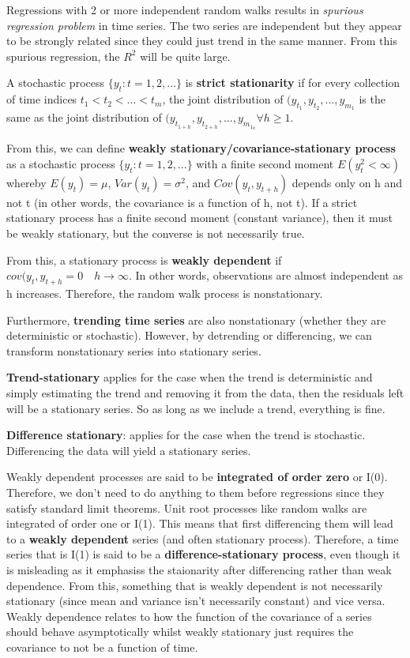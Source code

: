 \documentclass[11pt, oneside]{article}
\theoremstyle{definition}
\begin{document}
Regressions with 2 or more independent random walks results in \textit{spurious regression problem} in time series. The two series are independent but they appear to be strongly related since they could just trend in the same manner. From this spurious regression, the $R^2$ will be quite large.


A stochastic process $\{y_t:t=1,2,...\}$ is \textbf{strict stationarity} if for every collection of time indices $t_1 < t_2 < ... < t_m$, the joint distribution of $(y_{t_{1}},y_{t_{2}},...,y_{m_{1}}$ is the same as the joint distribution of $(y_{t_{1+h}},y_{t_{2+h}},...,y_{m_{1_h}} \forall h \geq 1$.

From this, we can define \textbf{weakly stationary/covariance-stationary process} as a stochastic process $\{y_t:t=1,2,...\}$ with a finite second moment $E(y_t^2 < \infty)$ whereby $E(y_t) = \mu$, $Var(y_t) = \sigma^2$, and $Cov(y_t, y_{t+h})$ depends only on h and not t (in other words, the covariance is a function of h, not t).  If a strict stationary process has a finite second moment (constant variance), then it must be weakly stationary, but the converse is not necessarily true.

From this, a stationary process is \textbf{weakly dependent} if $cov(y_t,y_{t+h} = 0 \quad h \rightarrow \infty$. In other words, observations are almost independent as h increases. Therefore, the random walk process is nonstationary.

Furthermore, \textbf{trending time series} are also nonstationary (whether they are deterministic or stochastic). However, by detrending or differencing, we can transform nonstationary series into stationary series.

\textbf{Trend-stationary} applies for the case when the trend is deterministic and simply estimating the trend and removing it from the data, then the residuals left will be a stationary series. So as long as we include a trend, everything is fine.

\textbf{Difference stationary}: applies for the case when the trend is stochastic. Differencing the data will yield a stationary series.

Weakly dependent processes are said to be \textbf{integrated of order zero} or I(0). Therefore, we don't need to do anything to them before regressions since they satisfy standard limit theorems. Unit root processes like random walks are integrated of order one or I(1). This means that first differencing them will lead to a \textbf{weakly dependent} series (and often stationary process). Therefore, a time series that is I(1) is said to be a \textbf{difference-stationary process}, even though it is misleading as it emphasiss the staionarity after differencing rather than weak dependence. From this, something that is weakly dependent is not necessarily stationary (since mean and variance isn't necessarily constant) and vice versa. Weakly dependence relates to how the function of the covariance of a series should behave asymptotically whilst weakly stationary just requires the covariance to not be a function of time.
\end{document}
